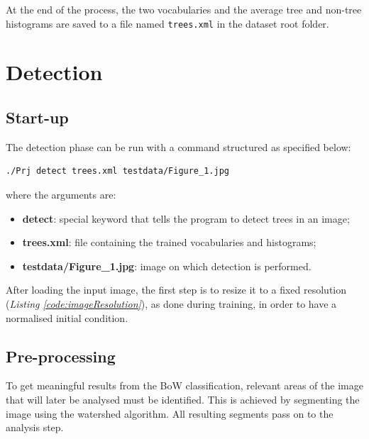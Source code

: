 \documentclass{article}
\begin{document}


At the end of the process, the two vocabularies and the average tree and non-tree histograms are saved to a file named \texttt{trees.xml} in the dataset root folder.

\section{Detection}
\subsection{Start-up}
The detection phase can be run with a command structured as specified below:

\begin{lstlisting}[style=CommandLine]
./Prj detect trees.xml testdata/Figure_1.jpg
\end{lstlisting}

where the arguments are:
\begin{itemize}
\item \textbf{detect}: special keyword that tells the program to detect trees in an image;
\item \textbf{trees.xml}: file containing the trained vocabularies and histograms;
\item \textbf{testdata/Figure\_1.jpg}: image on which detection is performed.
\end{itemize}

After loading the input image, the first step is to resize it to a fixed resolution (\textit{Listing \ref{code:imageResolution}}), as done during training, in order to have a normalised initial condition.



\subsection{Pre-processing}
To get meaningful results from the BoW classification, relevant areas of the image that will later be analysed must be identified. This is achieved by segmenting the image using the watershed algorithm. All resulting segments pass on to the analysis step.
\end{document}
